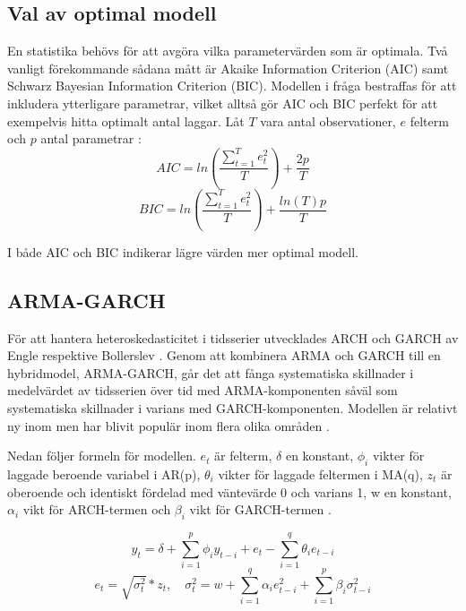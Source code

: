 \documentclass[11pt]{article}
\numberwithin{equation}{section}
\numberwithin{table}{section}
\numberwithin{figure}{section}
\begin{document}
\subsection{Val av optimal modell}
En statistika behövs för att avgöra vilka parametervärden som är optimala. Två vanligt förekommande sådana mått är Akaike Information Criterion (AIC) samt Schwarz Bayesian Information Criterion (BIC). Modellen i fråga bestraffas för att inkludera ytterligare parametrar, vilket alltså gör AIC och BIC perfekt för att exempelvis hitta optimalt antal laggar. Låt $T$ vara antal observationer, $e$ felterm och $p$ antal parametrar \parencite[][s.76 f.]{montgomery2015forecasting}:
\begin{equation}
    AIC = ln\left( \frac{\sum_{t=1}^{T}e^2_t}{T} \right)+\frac{2p}{T}
\end{equation}
\begin{equation}
    BIC = ln\left( \frac{\sum_{t=1}^{T}e^2_t}{T} \right)+\frac{ln(T)p}{T}
\end{equation}

I både AIC och BIC indikerar lägre värden mer optimal modell. 

\subsection{ARMA-GARCH}
För att hantera heteroskedasticitet i tidsserier utvecklades ARCH och GARCH av Engle \parencite*{engle1982autoregressive} respektive Bollerslev \parencite*{bollerslev1986generalized}. Genom att kombinera ARMA och GARCH till en hybridmodel, ARMA-GARCH, går det att fånga systematiska skillnader i medelvärdet av tidsserien över tid med ARMA-komponenten såväl som systematiska skillnader i varians med GARCH-komponenten. Modellen är relativt ny inom men har blivit populär inom flera olika områden \parencite{chen2011short}. 

Nedan följer formeln för modellen. \(e_t\) är felterm, \(\delta\) en konstant, \(\phi_i\) vikter för laggade beroende variabel i AR(p), \(\theta_i\) vikter för laggade feltermen i MA(q), \(z_t\) är oberoende och identiskt fördelad med väntevärde 0 och varians 1, w en konstant, \(\alpha_i\) vikt för ARCH-termen och \(\beta_i\) vikt för GARCH-termen \parencite[][,s.507 ff.]{bollerslev1986generalized, montgomery2015forecasting}.

\begin{equation}
    y_t = \delta + \sum_{i=1}^{p}\phi_iy_{t-i}  +e_t - \sum_{i=1}^{q}\theta_i e_{t-i} 
\end{equation}
\begin{equation}
    e_t=\sqrt{\sigma_t^2}*z_t,\quad \sigma^2_t=w + \sum_{i=1}^{q}\alpha_i e^2_{t-i} + \sum_{i=1}^{p}\beta_i \sigma^2_{t-i}
\end{equation}
\end{document}

